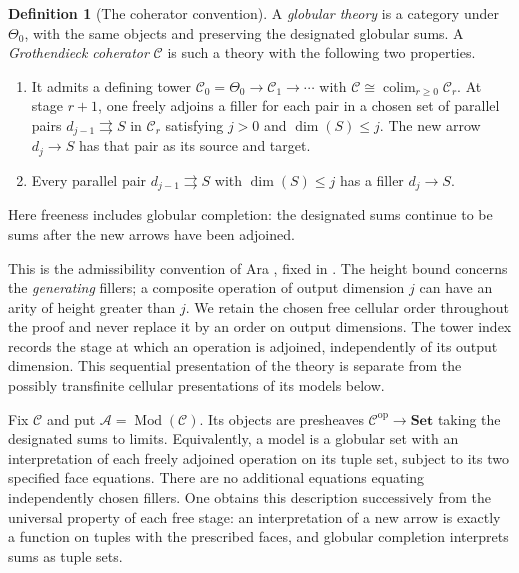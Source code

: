 \documentclass[11pt,letterpaper]{article}
\numberwithin{equation}{section}
\theoremstyle{plain}
\theoremstyle{definition}
\newtheorem{definition}[theorem]{Definition}
\theoremstyle{remark}
\DeclareMathOperator{\Mod}{Mod}
\DeclareMathOperator*{\colim}{colim}
\newcommand{\op}{\mathrm{op}}
\begin{document}
\begin{definition}[The coherator convention]\label{def:coherator}
A \emph{globular theory} is a category under $\Theta_0$, with the same
objects and preserving the designated globular sums.  A
\emph{Grothendieck coherator} $\mathcal C$ is such a theory with the
following two properties.
\begin{enumerate}
\item It admits a defining tower
$\mathcal C_0=\Theta_0\to\mathcal C_1\to\cdots$ with
$\mathcal C\cong\colim_{r\ge0}\mathcal C_r$.  At stage $r+1$, one
freely adjoins a filler for each pair in a chosen set of parallel pairs
$d_{j-1}\rightrightarrows S$ in $\mathcal C_r$ satisfying
$j>0$ and $\dim(S)\le j$.  The new arrow $d_j\to S$ has that pair
as its source and target.
\item Every parallel pair $d_{j-1}\rightrightarrows S$ with
$\dim(S)\le j$ has a filler $d_j\to S$.
\end{enumerate}
Here freeness includes globular completion: the designated sums continue
to be sums after the new arrows have been adjoined.
\end{definition}

This is the admissibility convention of Ara
\cite[Sections~2.3 and 2.9--2.11]{Ara2013}, fixed in
\cite[Section~5.3]{Henry2016}.  The height bound concerns the
\emph{generating} fillers; a composite operation of output dimension $j$
can have an arity of height greater than $j$.  We retain the chosen free
cellular order throughout the proof and never replace it by an order on
output dimensions.  The tower index records the stage at which an
operation is adjoined, independently of its output dimension.  This
sequential presentation of the theory is separate from the possibly
transfinite cellular presentations of its models below.

Fix $\mathcal C$ and put $\mathcal A=\Mod(\mathcal C)$.  Its objects are
presheaves $\mathcal C^{\op}\to\mathbf{Set}$ taking the designated sums
to limits.  Equivalently, a model is a globular set with an interpretation
of each freely adjoined operation on its tuple set, subject to its two
specified face equations.  There are no additional equations equating
independently chosen fillers.  One obtains this description successively
from the universal property of each free stage: an interpretation of a
new arrow is exactly a function on tuples with the prescribed faces, and
globular completion interprets sums as tuple sets.
\end{document}
